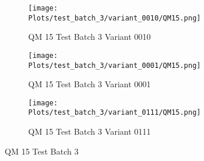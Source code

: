 \documentclass{DissertateFigs}
\begin{document}
\begin{figure}[t!]
\medskip

    \begin{subfigure}{0.32\textwidth}
    \texttt{[image: Plots/test\_batch\_3/variant\_0010/QM15.png]}
    \caption{QM 15 Test Batch 3 Variant 0010}
    \end{subfigure}
    \begin{subfigure}{0.32\textwidth}
    \texttt{[image: Plots/test\_batch\_3/variant\_0001/QM15.png]}
    \caption{QM 15 Test Batch 3 Variant 0001}
    \end{subfigure}

\medskip

    \begin{subfigure}{0.32\textwidth}
    \texttt{[image: Plots/test\_batch\_3/variant\_0111/QM15.png]}
    \caption{QM 15 Test Batch 3 Variant 0111}
    \end{subfigure}
\caption{QM 15 Test Batch 3}
    \end{figure}
\clearpage
\end{document}
